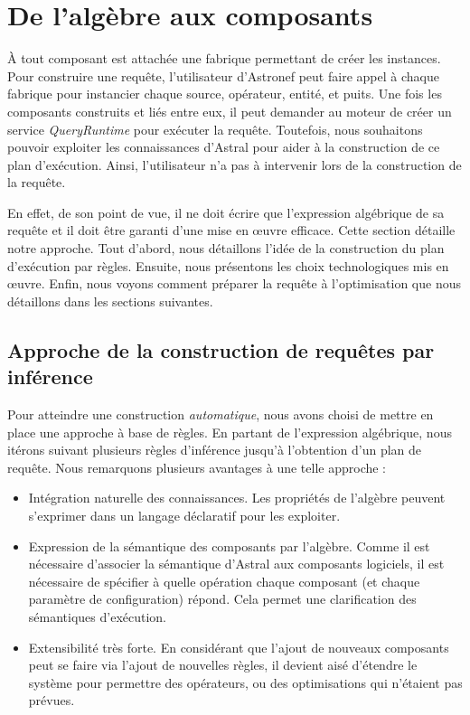 \section{De l'algèbre aux composants}\label{sec:contrib:astronef:preparation}
À tout composant est attachée une fabrique permettant de créer les instances. Pour construire une requête, l'utilisateur d'Astronef peut faire appel à chaque fabrique pour instancier chaque source, opérateur, entité, et puits. Une fois les composants construits et liés entre eux, il peut demander au moteur de créer un service \textit{QueryRuntime} pour exécuter la requête. Toutefois, nous souhaitons pouvoir exploiter les connaissances d'Astral pour aider à la construction de ce plan d'exécution. Ainsi, l'utilisateur n'a pas à intervenir lors de la construction de la requête.

En effet, de son point de vue, il ne doit écrire que l'expression algébrique de sa requête et il doit être garanti d'une mise en œuvre efficace. Cette section détaille notre approche. Tout d'abord, nous détaillons l'idée de la construction du plan d'exécution par règles. Ensuite, nous présentons les choix technologiques mis en œuvre. Enfin, nous voyons comment préparer la requête à l'optimisation que nous détaillons dans les sections suivantes.

\subsection{Approche de la construction de requêtes par inférence}
Pour atteindre une construction \textit{automatique}, nous avons choisi de mettre en place une approche à base de règles. En partant de l'expression algébrique, nous itérons suivant plusieurs règles d'inférence jusqu'à l'obtention d'un plan de requête. Nous remarquons plusieurs avantages à une telle approche :
\begin{itemize}
	\item Intégration naturelle des connaissances. Les propriétés de l'algèbre peuvent s'exprimer dans un langage déclaratif pour les exploiter.
	\item Expression de la sémantique des composants par l'algèbre. Comme il est nécessaire d'associer la sémantique d'Astral aux composants logiciels, il est nécessaire de spécifier à quelle opération chaque composant (et chaque paramètre de configuration) répond. Cela permet une clarification des sémantiques d'exécution.
	\item Extensibilité très forte. En considérant que l'ajout de nouveaux composants peut se faire via l'ajout de nouvelles règles, il devient aisé d'étendre le système pour permettre des opérateurs, ou des optimisations qui n'étaient pas prévues.
\end{itemize}


